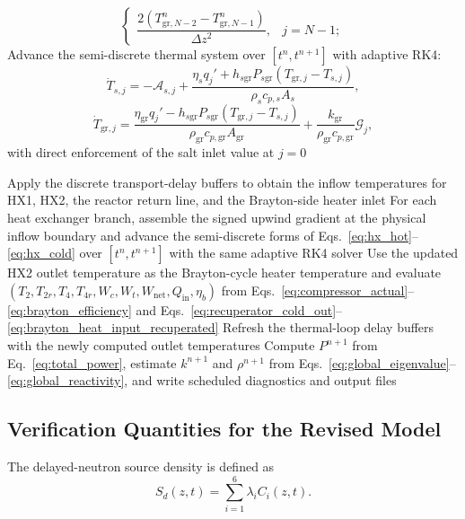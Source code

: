 \documentclass[a4paper,12pt]{article}
\begin{document}
\begin{algorithm}[t]
{\[\begin{cases}
\dfrac{2\left(T_{\mathrm{gr},N-2}^n-T_{\mathrm{gr},N-1}^n\right)}{\Delta z^2}, & j=N-1;
\end{cases}
\]
}
Advance the semi-discrete thermal system over \([t^n,t^{n+1}]\) with
adaptive RK4:
\[
\dot{T}_{s,j}=
-\mathcal{A}_{s,j}
+
\frac{\eta_s q_j'+h_{s\mathrm{gr}}P_{s\mathrm{gr}}\left(T_{\mathrm{gr},j}-T_{s,j}\right)}{\rho_s c_{p,s}A_s},
\]
\[
\dot{T}_{\mathrm{gr},j}=
\frac{\eta_{\mathrm{gr}} q_j'-h_{s\mathrm{gr}}P_{s\mathrm{gr}}\left(T_{\mathrm{gr},j}-T_{s,j}\right)}{\rho_{\mathrm{gr}} c_{p,\mathrm{gr}}A_{\mathrm{gr}}}
+
\frac{k_{\mathrm{gr}}}{\rho_{\mathrm{gr}} c_{p,\mathrm{gr}}}\mathcal{G}_j,
\]
with direct enforcement of the salt inlet value at \(j=0\)\;
\end{algorithm}

\begin{algorithm}[t]
\DontPrintSemicolon
\SetAlgoLined
\small
\caption{Loop, heat-exchanger, and Brayton-cycle coupling update}
\label{alg:fdtd_loop_msre_bc}
Apply the discrete transport-delay buffers to obtain the inflow
temperatures for HX1, HX2, the reactor return line, and the Brayton-side
heater inlet\;
For each heat exchanger branch, assemble the signed upwind gradient at
the physical inflow boundary and advance the semi-discrete forms of
Eqs.~\eqref{eq:hx_hot}--\eqref{eq:hx_cold} over \([t^n,t^{n+1}]\) with
the same adaptive RK4 solver\;
Use the updated HX2 outlet temperature as the Brayton-cycle heater
temperature and evaluate
\((T_2,T_{2r},T_4,T_{4r},W_c,W_t,W_{\mathrm{net}},Q_{\mathrm{in}},\eta_b)\)
from Eqs.~\eqref{eq:compressor_actual}--\eqref{eq:brayton_efficiency}
and Eqs.~\eqref{eq:recuperator_cold_out}--\eqref{eq:brayton_heat_input_recuperated}\;
Refresh the thermal-loop delay buffers with the newly computed outlet
temperatures\;
Compute \(P^{n+1}\) from Eq.~\eqref{eq:total_power}, estimate
\(k^{n+1}\) and \(\rho^{n+1}\) from
Eqs.~\eqref{eq:global_eigenvalue}--\eqref{eq:global_reactivity}, and
write scheduled diagnostics and output files\;
\end{algorithm}

\subsection{Verification Quantities for the Revised Model}

The delayed-neutron source density is defined as
\begin{equation}
S_d(z,t)
=
\sum_{i=1}^{6}
\lambda_i C_i(z,t).
\label{eq:delayed_source_density}
\end{equation}
\end{document}
